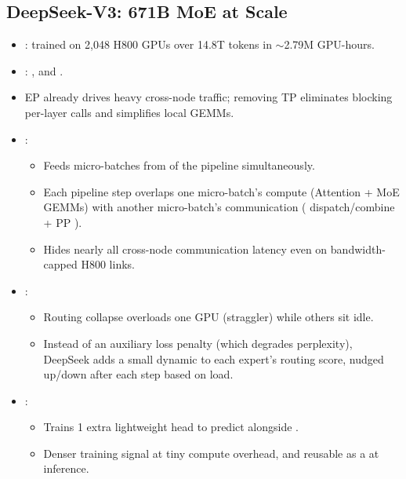 \subsection{DeepSeek-V3: 671B MoE at Scale}
\begin{itemize}
    \item {}: trained on 2,048 H800 GPUs over 14.8T tokens in $\sim$2.79M GPU-hours.
    \item {}: , and .
    \item {} EP already drives heavy cross-node  traffic; removing TP eliminates blocking per-layer  calls and simplifies local GEMMs.
    \item {}:
    \begin{itemize}
        \item Feeds micro-batches from  of the pipeline simultaneously.
        \item Each pipeline step overlaps one micro-batch's compute (Attention + MoE GEMMs) with another micro-batch's communication ( dispatch/combine + PP ).
        \item Hides nearly all cross-node communication latency even on bandwidth-capped H800 links.
    \end{itemize}
    \item {}:
    \begin{itemize}
        \item Routing collapse overloads one GPU (straggler) while others sit idle.
        \item Instead of an auxiliary loss penalty (which degrades perplexity), DeepSeek adds a small dynamic  to each expert's routing score, nudged up/down after each step based on load.
    \end{itemize}
    \item {}:
    \begin{itemize}
        \item Trains 1 extra lightweight head to predict  alongside .
        \item Denser training signal at tiny compute overhead, and reusable as a  at inference.
    \end{itemize}
\end{itemize}

